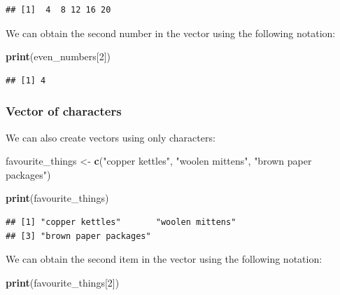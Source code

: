 \documentclass[
]{krantz}
\makeatletter
\newenvironment{Shaded}{\begin{snugshade}}{\end{snugshade}}
\newcommand{\DecValTok}[1]{\textcolor[rgb]{0.06,0.06,0.06}{#1}}
\newcommand{\KeywordTok}[1]{\textcolor[rgb]{0.27,0.27,0.27}{\textbf{#1}}}
\newcommand{\NormalTok}[1]{#1}
\newcommand{\StringTok}[1]{\textcolor[rgb]{0.5,0.5,0.5}{#1}}
\newenvironment{kframe}{%
\medskip{}
\setlength{\fboxsep}{.8em}
 \def\at@end@of@kframe{}%
 \ifinner\ifhmode%
  \def\at@end@of@kframe{\end{minipage}}%
  \begin{minipage}{\columnwidth}%
 \fi\fi%
 \def\FrameCommand##1{\hskip\@totalleftmargin \hskip-\fboxsep
 \colorbox{shadecolor}{##1}\hskip-\fboxsep
     \hskip-\linewidth \hskip-\@totalleftmargin \hskip\columnwidth}%
 \MakeFramed {\advance\hsize-\width
   \@totalleftmargin\z@ \linewidth\hsize
   \@setminipage}}%
 {\par\unskip\endMakeFramed%
 \at@end@of@kframe}
\renewenvironment{Shaded}{\begin{kframe}}{\end{kframe}}
\makeatother
\begin{document}
\begin{verbatim}
## [1]  4  8 12 16 20
\end{verbatim}

We can obtain the second number in the vector using the following notation:

\begin{Shaded}
\begin{Highlighting}[]
\KeywordTok{print}\NormalTok{(even_numbers[}\DecValTok{2}\NormalTok{])}
\end{Highlighting}
\end{Shaded}

\begin{verbatim}
## [1] 4
\end{verbatim}

\hypertarget{vector-of-characters}{%
\subsubsection{Vector of characters}\label{vector-of-characters}}

We can also create vectors using only characters:

\begin{Shaded}
\begin{Highlighting}[]
\NormalTok{favourite_things <-}\StringTok{ }\KeywordTok{c}\NormalTok{(}\StringTok{"copper kettles"}\NormalTok{, }\StringTok{"woolen mittens"}\NormalTok{, }\StringTok{"brown paper packages"}\NormalTok{)}
\end{Highlighting}
\end{Shaded}

\begin{Shaded}
\begin{Highlighting}[]
\KeywordTok{print}\NormalTok{(favourite_things)}
\end{Highlighting}
\end{Shaded}

\begin{verbatim}
## [1] "copper kettles"       "woolen mittens"      
## [3] "brown paper packages"
\end{verbatim}

We can obtain the second item in the vector using the following notation:

\begin{Shaded}
\begin{Highlighting}[]
\KeywordTok{print}\NormalTok{(favourite_things[}\DecValTok{2}\NormalTok{])}
\end{Highlighting}
\end{Shaded}
\end{document}
